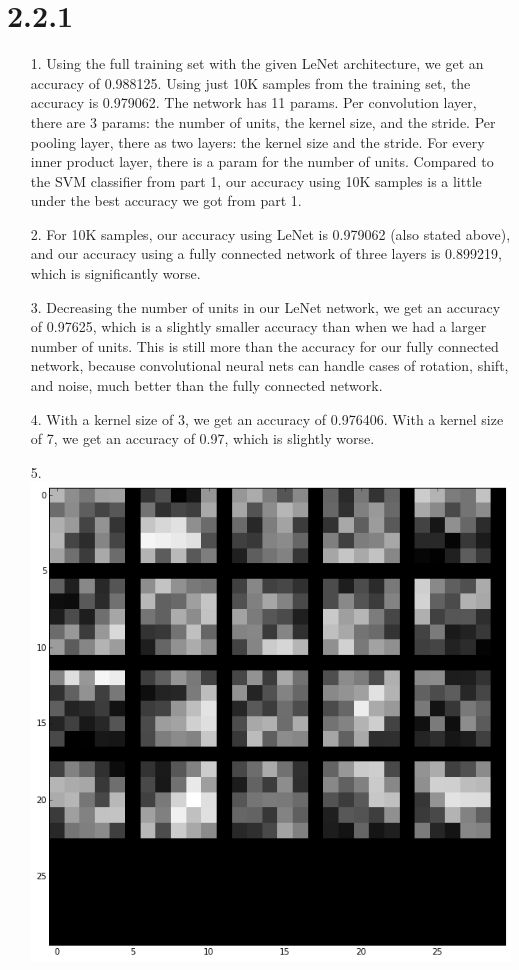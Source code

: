 \documentclass[11pt]{article}
\begin{document}
\section*{2.2.1}
\begin{itemize}
\item[1.] Using the full training set with the given LeNet architecture, we get an accuracy of 0.988125. Using just 10K samples from the training set, the accuracy is 0.979062. The network has 11 params. Per convolution layer, there are 3 params: the number of units, the kernel size, and the stride. Per pooling layer, there as two layers: the kernel size and the stride. For every inner product layer, there is a param for the number of units. Compared to the SVM classifier from part 1, our accuracy using 10K samples is a little under the best accuracy we got from part 1.
\item[2.] For 10K samples, our accuracy using LeNet is 0.979062 (also stated above), and our accuracy using a fully connected network of three layers is 0.899219, which is significantly worse. 
\item[3.] Decreasing the number of units in our LeNet network, we get an accuracy of 0.97625, which is a slightly smaller accuracy than when we had a larger number of units. This is still more than the accuracy for our fully connected network, because convolutional neural nets can handle cases of rotation, shift, and noise, much better than the fully connected network.
\item[4.] With a kernel size of 3, we get an accuracy of 0.976406. With a kernel size of 7, we get an accuracy of 0.97, which is slightly worse. 
\item[5.] \includegraphics[scale=0.3]{diagrams/filter.png}\\

\end{itemize}
\end{document}

